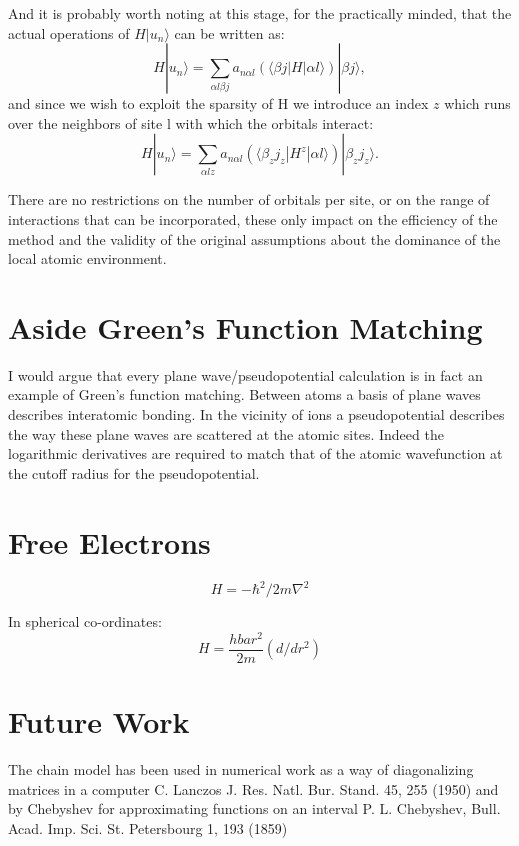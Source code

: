 \documentclass{article}
\def\ket{\rangle}
\def\bra{\langle}
\begin{document}
And it is probably worth noting at this stage, for the practically minded,  
that the actual operations of $H|u_{n}\ket$ can be written as:
%
\begin{equation}
H|u_{n}\ket = \sum_{\alpha l \beta j}a_{n \alpha l}(\bra \beta j |H| \alpha l\ket)|\beta j\ket,
\end{equation}
%
and since we wish to exploit the sparsity of H we introduce an index $z$ which
runs over the neighbors of site l with which the orbitals interact:
\begin{equation}
H|u_{n}\ket = \sum_{\alpha l z}a_{n \alpha l}(\bra \beta_{z} j_{z} |H^{z}|\alpha l\ket)|\beta_{z} j_{z}\ket.
\end{equation}

There are no restrictions on the number of orbitals per site, or on the range of interactions that can be
incorporated, these only impact on the efficiency of the method and the validity of the original assumptions
about the dominance of the local atomic environment.

\section{Aside Green's Function Matching}
I would argue that every plane wave/pseudopotential calculation is in fact
an example of Green's function matching. Between atoms a basis of plane
waves describes interatomic bonding. In the vicinity of ions a pseudopotential
describes the way these plane waves are scattered at the atomic sites.
Indeed the logarithmic derivatives are required to match 
that of the atomic wavefunction at the cutoff radius for the pseudopotential.

\section{Free Electrons}
\begin{equation}
H = - \hbar^{2}/2m \nabla^{2}
\end{equation}

In spherical co-ordinates:
%
\begin{equation}
H = \frac{hbar^{2}}{2m}(d/dr^{2}  ) 
\end{equation}

\section{Future Work}
The chain model has been used in numerical work as a way of 
diagonalizing matrices in a computer 
C. Lanczos J. Res. Natl. Bur. Stand. 45, 255 (1950) and
by Chebyshev for approximating functions on an interval
P. L. Chebyshev, Bull. Acad. Imp. Sci. St. Petersbourg 1, 193 (1859)
\end{document}
